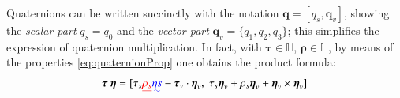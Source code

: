 \documentclass[preprint, 12pt]{elsarticle}
\def\vect#1{{\boldsymbol{#1}}}
\def\quat#1{{\boldsymbol{#1}}}
\providecommand{\DIFadd}[1]{{\protect\color{blue}\uwave{#1}}} %
\providecommand{\DIFdel}[1]{{\protect\color{red}\sout{#1}}}                      %
\providecommand{\DIFaddbegin}{} %
\providecommand{\DIFaddend}{} %
\providecommand{\DIFdelbegin}{} %
\providecommand{\DIFdelend}{} %
\begin{document}
Quaternions can be written succinctly with the notation $\quat{q}=[q_{s},\vect{q}_{v}]$, showing the \textit{scalar part} $q_s=q_0$ and the \textit{vector part} $\vect{q}_v = \{q_1, q_2, q_3\}$; this simplifies the expression of quaternion multiplication. In fact, with $\quat{\tau}\in\mathbb{H}$, \DIFdelbegin \DIFdel{$\quat{\rho}\in\mathbb{H}$}\DIFdelend \DIFaddbegin \DIFadd{$\quat{\eta}\in\mathbb{H}$}\DIFaddend , by means of the properties \eqref{eq:quaternionProp} one obtains the product formula:
\begin{align} 
\quat{\tau} \: \DIFdelbegin %
\DIFdelend \DIFaddbegin \quat{\eta} \DIFaddend = [ \tau_{s}\DIFdelbegin \DIFdel{\rho_{s} }\DIFdelend \DIFaddbegin \DIFadd{\eta{s} }\DIFaddend - \vect{\tau}_{v}\cdot\DIFdelbegin %
\DIFdelend \DIFaddbegin \vect{\eta}\DIFaddend _{v}, \;
\tau_{s}\DIFdelbegin %
\DIFdelend \DIFaddbegin \vect{\eta}\DIFaddend _{v} + \rho_{s}\DIFdelbegin %
\DIFdelend \DIFaddbegin \vect{\eta}\DIFaddend _{v} + \DIFdelbegin %
\DIFdelend \DIFaddbegin \vect{\eta}\DIFaddend _{v} \times \DIFdelbegin %
\DIFdelend \DIFaddbegin \vect{\eta}\DIFaddend _{v} ]
\end{align}
\end{document}

